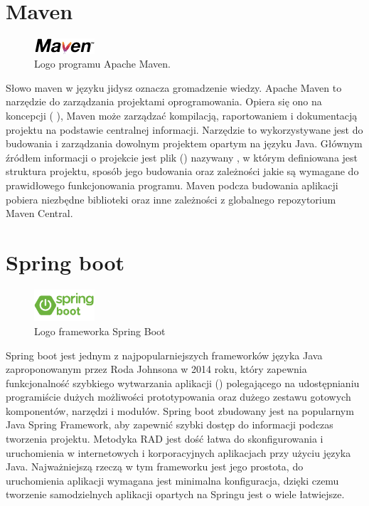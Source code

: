 \section{Maven}

\begin{figure}[htbp!]
    \centering
    \includegraphics[width=0.2\textwidth]{images/mavenLogo.png}
    \caption{Logo programu Apache Maven\cite{mavenSite}.}
    \label{fig:enter-label}
\end{figure}

Słowo maven  w języku jidysz oznacza gromadzenie wiedzy. Apache Maven to narzędzie do zarządzania projektami oprogramowania. Opiera się ono na koncepcji  ( ), Maven może zarządzać kompilacją, raportowaniem i dokumentacją projektu na podstawie centralnej informacji. Narzędzie to wykorzystywane jest do budowania i zarządzania dowolnym projektem opartym na języku Java. Głównym źródłem informacji o projekcie jest plik  () nazywany , w którym definiowana jest struktura projektu, sposób jego budowania oraz zależności jakie są wymagane do prawidłowego funkcjonowania programu. Maven podcza budowania aplikacji pobiera niezbędne biblioteki oraz inne zależności z globalnego repozytorium Maven Central\cite{mavenSite}.

\section{Spring boot}

\begin{figure}[!htbp]
    \centering
    \includegraphics[width=0.2\textwidth]{images/springboot/springBootLogo.png}
    \caption{Logo frameworka Spring Boot \cite{springLogo}}
    \label{fig:enter-label}
\end{figure}


Spring boot jest jednym z najpopularniejszych frameworków języka Java zaproponowanym przez Roda Johnsona w 2014 roku, który zapewnia funkcjonalność szybkiego wytwarzania aplikacji () polegającego na udostępnianiu programiście dużych możliwości prototypowania oraz dużego zestawu gotowych komponentów, narzędzi i modułów\cite{RADwiki}. Spring boot zbudowany jest na popularnym Java Spring Framework, aby zapewnić szybki dostęp do informacji podczas tworzenia projektu. Metodyka RAD jest dość łatwa do skonfigurowania i uruchomienia w internetowych i korporacyjnych aplikacjach przy użyciu języka Java. Najważniejszą rzeczą w tym frameworku jest jego prostota, do uruchomienia aplikacji wymagana jest minimalna konfiguracja, dzięki czemu tworzenie samodzielnych aplikacji opartych na Springu jest o wiele łatwiejsze\cite{springbootAnalysis}.

